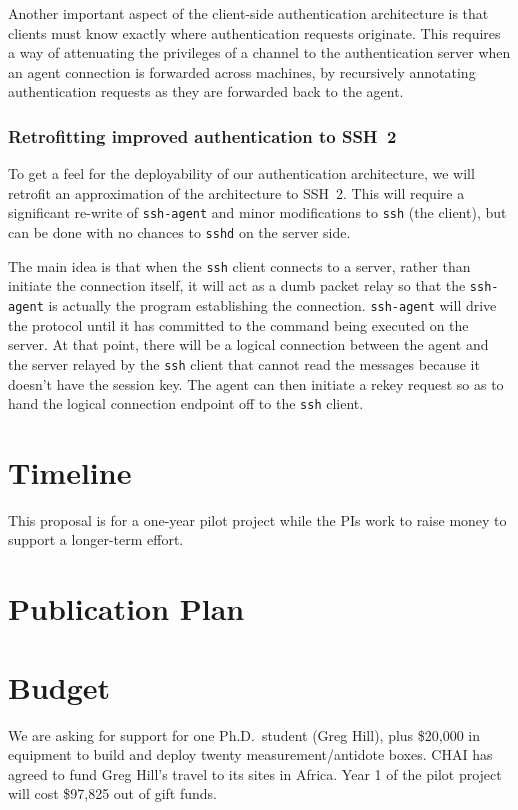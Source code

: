 \documentclass[11pt]{article}
\begin{document}
Another important aspect of the client-side authentication
architecture is that clients must know exactly where authentication
requests originate.  This requires a way of attenuating the privileges
of a channel to the authentication server when an agent connection is
forwarded across machines, by recursively annotating authentication
requests as they are forwarded back to the agent.

\subsubsection{Retrofitting improved authentication to SSH~2}

To get a feel for the deployability of our authentication
architecture, we will retrofit an approximation of the architecture to
SSH~2.  This will require a significant re-write of \texttt{ssh-agent}
and minor modifications to \texttt{ssh} (the client), but can be done
with no chances to \texttt{sshd} on the server side.

The main idea is that when the \texttt{ssh} client connects to a
server, rather than initiate the connection itself, it will act as a
dumb packet relay so that the \texttt{ssh-agent} is actually the
program establishing the connection.  \texttt{ssh-agent} will drive
the protocol until it has committed to the command being executed on
the server.  At that point, there will be a logical connection between
the agent and the server relayed by the \texttt{ssh} client that
cannot read the messages because it doesn't have the session key.  The
agent can then initiate a rekey request so as to hand the logical
connection endpoint off to the \texttt{ssh} client.

\section{Timeline}

This proposal is for a one-year pilot project while the PIs work to
raise money to support a longer-term effort.

\section{Publication Plan}

\section{Budget}

We are asking for support for one Ph.D.~student (Greg Hill), plus
\$20,000 in equipment to build and deploy twenty measurement/antidote
boxes. CHAI has agreed to fund Greg Hill's travel to its sites in
Africa. Year 1 of the pilot project will cost \$97,825 out of gift
funds.
\end{document}
